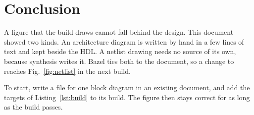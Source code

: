 \section{Conclusion}
\label{sec:conclusion}

A figure that the build draws cannot fall behind the design. This document
showed two kinds. An architecture diagram is written by hand in a few lines
of text and kept beside the HDL. A netlist drawing needs no source of its
own, because synthesis writes it. Bazel ties both to the document, so a
change to  reaches Fig.~\ref{fig:netlist} in the next build.

To start, write a  file for one block diagram in an
existing document, and add the targets of Listing~\ref{lst:build} to its
build. The figure then stays correct for as long as the build passes.
